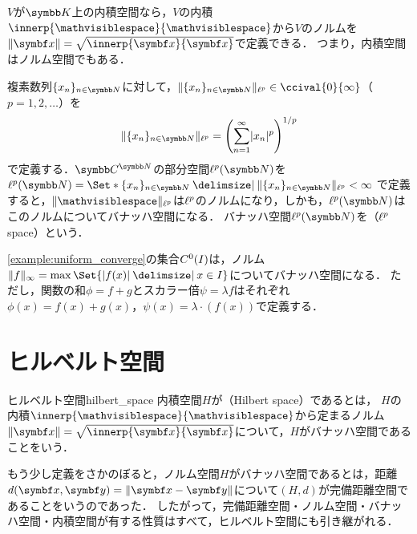 \documentclass[../../main]{subfiles}
\begin{document}
\begin{example}
  \(V\)が\(\numset{K}\)上の内積空間なら，\(V\)の内積\(\innerp{\holder}{\holder}\)から\(V\)のノルムを\(\vnorm{\vect{x}}=\sqrt{\innerp{\vect{x}}{\vect{x}}}\)で定義できる．
  つまり，内積空間はノルム空間でもある．
\end{example}

\begin{example}[\(\lebesgue{p}\)空間]
  複素数列\(\seq{x_n}_{n\in\numset{N}}\)に対して，\(\vnorm{\seq{x_n}_{n\in\numset{N}}}_{\lebesgue{p}}\in\ccival{0}{\infty}\)（\(p=1,2,\dotsc\)）を
  \[
    \vnorm{\seq{x_n}_{n\in\numset{N}}}_{\lebesgue{p}} = \pqty*{\sum_{n=1}^\infty\abs{x_n}^p}^{1/p}
  \]
  で定義する．\(\numset{C}^{\numset{N}}\)の部分空間\(\lebesgue{p}(\numset{N})\)を\(\lebesgue{p}(\numset{N})=\Set*{\seq{x_n}_{n\in\numset{N}}\given\vnorm{\seq{x_n}_{n\in\numset{N}}}_{\lebesgue{p}}<\infty}\)
  で定義すると，\(\vnorm{\holder}_{\lebesgue{p}}\)は\(\lebesgue{p}\)のノルムになり，しかも，\(\lebesgue{p}(\numset{N})\)はこのノルムについてバナッハ空間になる．
  バナッハ空間\(\lebesgue{p}(\numset{N})\)を（\(\lebesgue{p}\) space）という．
\end{example}

\begin{example}
  \cref{example:uniform_converge}の集合\(C^0(I)\)は，ノルム\(\vnorm{f}_\infty=\max\Set{\abs{f(x)}\given x\in I}\)についてバナッハ空間になる．
  ただし，関数の和\(\phi=f+g\)とスカラー倍\(\psi=\lambda f\)はそれぞれ\(\phi(x)=f(x)+g(x)\)，\(\psi(x)=\lambda\cdot(f(x))\)で定義する．
\end{example}

\section{ヒルベルト空間}

\begin{definition}{ヒルベルト空間}{hilbert_space}
  内積空間\(H\)が（Hilbert space）であるとは，
  \(H\)の内積\(\innerp{\holder}{\holder}\)から定まるノルム\(\vnorm{\vect{x}}=\sqrt{\innerp{\vect{x}}{\vect{x}}}\)について，\(H\)がバナッハ空間であることをいう．
\end{definition}

もう少し定義をさかのぼると，ノルム空間\(H\)がバナッハ空間であるとは，距離\(d(\vect{x},\vect{y})=\vnorm{\vect{x}-\vect{y}}\)について\((H,d)\)が完備距離空間であることをいうのであった．
したがって，完備距離空間・ノルム空間・バナッハ空間・内積空間が有する性質はすべて，ヒルベルト空間にも引き継がれる．
\end{document}
